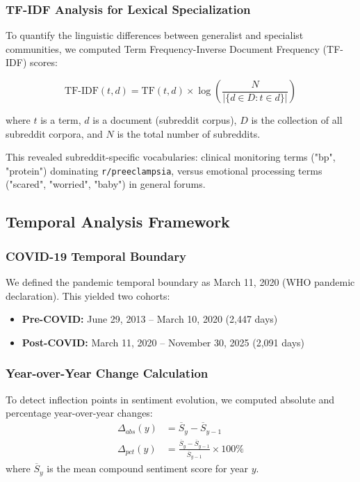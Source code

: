 \documentclass[12pt, a4paper]{article}
\begin{document}
\subsubsection{TF-IDF Analysis for Lexical Specialization}
To quantify the linguistic differences between generalist and specialist communities, we computed Term Frequency-Inverse Document Frequency (TF-IDF) scores:

\begin{equation}
    \text{TF-IDF}(t, d) = \text{TF}(t, d) \times \log\left(\frac{N}{|\{d \in D : t \in d\}|}\right)
\end{equation}

where $t$ is a term, $d$ is a document (subreddit corpus), $D$ is the collection of all subreddit corpora, and $N$ is the total number of subreddits.

This revealed subreddit-specific vocabularies: clinical monitoring terms ("bp", "protein") dominating \texttt{r/preeclampsia}, versus emotional processing terms ("scared", "worried", "baby") in general forums.

\subsection{Temporal Analysis Framework}

\subsubsection{COVID-19 Temporal Boundary}
We defined the pandemic temporal boundary as March 11, 2020 (WHO pandemic declaration). This yielded two cohorts:
\begin{itemize}
    \item \textbf{Pre-COVID:} June 29, 2013 – March 10, 2020 (2,447 days)
    \item \textbf{Post-COVID:} March 11, 2020 – November 30, 2025 (2,091 days)
\end{itemize}

\subsubsection{Year-over-Year Change Calculation}
To detect inflection points in sentiment evolution, we computed absolute and percentage year-over-year changes:
\begin{align}
    \Delta_{abs}(y) &= \overline{S}_y - \overline{S}_{y-1} \\
    \Delta_{pct}(y) &= \frac{\overline{S}_y - \overline{S}_{y-1}}{\overline{S}_{y-1}} \times 100\%
\end{align}
where $\overline{S}_y$ is the mean compound sentiment score for year $y$.
\end{document}
